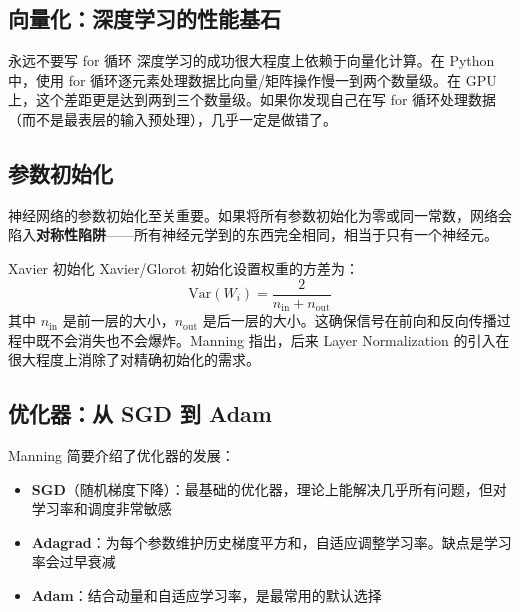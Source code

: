 \documentclass[a4paper]{article}
\begin{document}
\subsection{向量化：深度学习的性能基石}

\begin{warningbox}{永远不要写 for 循环}
深度学习的成功很大程度上依赖于向量化计算。在 Python 中，使用 for 循环逐元素处理数据比向量/矩阵操作慢一到两个数量级。在 GPU 上，这个差距更是达到两到三个数量级。如果你发现自己在写 for 循环处理数据（而不是最表层的输入预处理），几乎一定是做错了。
\end{warningbox}

\subsection{参数初始化}

神经网络的参数初始化至关重要。如果将所有参数初始化为零或同一常数，网络会陷入\textbf{对称性陷阱}——所有神经元学到的东西完全相同，相当于只有一个神经元。





\begin{importantbox}{Xavier 初始化}
Xavier/Glorot 初始化设置权重的方差为：
$$\text{Var}(W_i) = \frac{2}{n_{\text{in}} + n_{\text{out}}}$$
其中 $n_{\text{in}}$ 是前一层的大小，$n_{\text{out}}$ 是后一层的大小。这确保信号在前向和反向传播过程中既不会消失也不会爆炸。Manning 指出，后来 Layer Normalization 的引入在很大程度上消除了对精确初始化的需求。
\end{importantbox}

\subsection{优化器：从 SGD 到 Adam}

Manning 简要介绍了优化器的发展：





\begin{itemize}
    \item \textbf{SGD}（随机梯度下降）：最基础的优化器，理论上能解决几乎所有问题，但对学习率和调度非常敏感
    \item \textbf{Adagrad}：为每个参数维护历史梯度平方和，自适应调整学习率。缺点是学习率会过早衰减
    \item \textbf{Adam}：结合动量和自适应学习率，是最常用的默认选择
\end{itemize}
\end{document}
